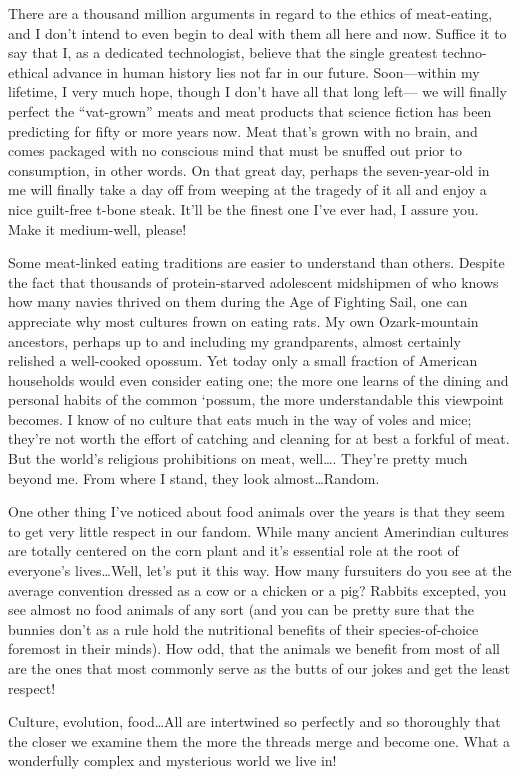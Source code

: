 There are a thousand million arguments in regard to the ethics of meat-eating, and I don't intend to even begin to deal with them all here and now. Suffice it to say that I, as a dedicated technologist, believe that the single greatest techno-ethical advance in human history lies not far in our future. Soon—within my lifetime, I very much hope, though I don't have all that long left— we will finally perfect the ``vat-grown'' meats and meat products that science fiction has been predicting for fifty or more years now. Meat that's grown with no brain, and comes packaged with no conscious mind that must be snuffed out prior to consumption, in other words. On that great day, perhaps the seven-year-old in me will finally take a day off from weeping at the tragedy of it all and enjoy a nice guilt-free t-bone steak. It'll be the finest one I've ever had, I assure you. Make it medium-well, please!

Some meat-linked eating traditions are easier to understand than others. Despite the fact that thousands of protein-starved adolescent midshipmen of who knows how many navies thrived on them during the Age of Fighting Sail, one can appreciate why most cultures frown on eating rats. My own Ozark-mountain ancestors, perhaps up to and including my grandparents, almost certainly relished a well-cooked opossum. Yet today only a small fraction of American households would even consider eating one; the more one learns of the dining and personal habits of the common `possum, the more understandable this viewpoint becomes. I know of no culture that eats much in the way of voles and mice; they're not worth the effort of catching and cleaning for at best a forkful of meat. But the world's religious prohibitions on meat, well\ldots. They're pretty much beyond me. From where I stand, they look almost\ldots Random.

One other thing I've noticed about food animals over the years is that they seem to get very little respect in our fandom. While many ancient Amerindian cultures are totally centered on the corn plant and it's essential role at the root of everyone's lives\ldots Well, let's put it this way. How many fursuiters do you see at the average convention dressed as a cow or a chicken or a pig? Rabbits excepted, you see almost no food animals of any sort (and you can be pretty sure that the bunnies don't as a rule hold the nutritional benefits of their species-of-choice foremost in their minds). How odd, that the animals we benefit from most of all are the ones that most commonly serve as the butts of our jokes and get the least respect!

Culture, evolution, food\ldots All are intertwined so perfectly and so thoroughly that the closer we examine them the more the threads merge and become one. What a wonderfully complex and mysterious world we live in!
